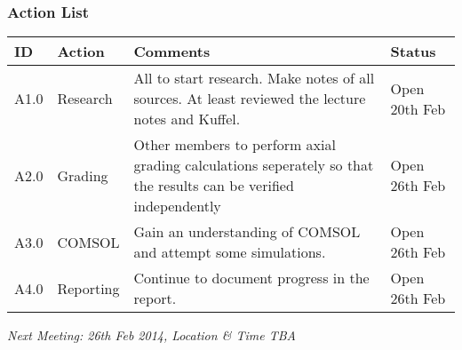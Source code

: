 \subsubsection{Action List}
\begin{center}
\begin{longtable}{| p{} | >{\raggedright\arraybackslash}p{} |  p{} | >{\raggedright\arraybackslash}p{}|} \hline
\textbf{ID} & \textbf{Action} & \textbf{Comments} & \textbf{Status} \\ \hline
\endhead
A1.0	&	Research	&	All to start research. Make notes of all sources. At least reviewed the lecture notes and Kuffel.	& Open 20th Feb \\ \hline
A2.0	&	Grading	&	Other members to perform axial grading calculations seperately so that the results can be verified independently	& Open 26th Feb \\ \hline
A3.0	&	COMSOL	&	Gain an understanding of COMSOL and attempt some simulations. & Open 26th Feb \\ \hline
A4.0	&	Reporting	&	Continue to document progress in the report.	&	Open 26th Feb \\ \hline
	
\end{longtable}
\end{center}

\emph{Next Meeting: 26th Feb 2014, Location \& Time TBA}